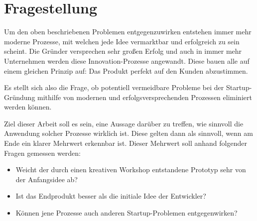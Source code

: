 \section{Fragestellung}
Um den oben beschriebenen Problemen entgegenzuwirken entstehen immer mehr moderne Prozesse, mit welchen jede Idee vermarktbar und erfolgreich zu sein scheint. Die Gründer versprechen sehr großen Erfolg und auch in immer mehr Unternehmen werden diese Innovation-Prozesse angewandt. Diese bauen alle auf einem gleichen Prinzip auf: Das Produkt perfekt auf den Kunden abzustimmen.

Es stellt sich also die Frage, ob potentiell vermeidbare Probleme bei der Startup-Gründung mithilfe von modernen und erfolgsversprechenden Prozessen eliminiert werden können. 

Ziel dieser Arbeit soll es sein, eine Aussage darüber zu treffen, wie sinnvoll die Anwendung solcher Prozesse wirklich ist. Diese gelten dann als sinnvoll, wenn am Ende ein klarer Mehrwert erkennbar ist. Dieser Mehrwert soll anhand folgender Fragen gemessen werden: 
\begin{itemize}
	\itemsep0em
	\item Weicht der durch einen kreativen Workshop entstandene Prototyp sehr von der Anfangsidee ab?	
	\item Ist das Endprodukt besser als die initiale Idee der Entwickler?
	\item Können jene Prozesse auch anderen Startup-Problemen entgegenwirken?
\end{itemize}

